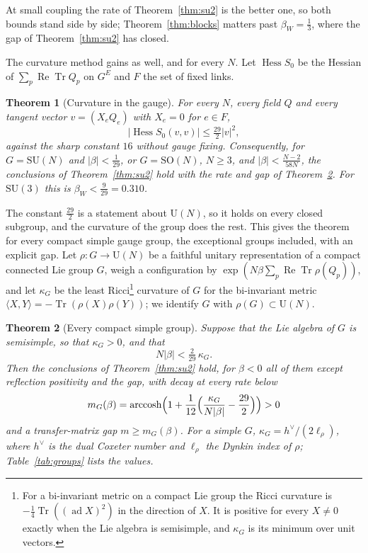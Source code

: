 \documentclass[aps,prd,twocolumn,superscriptaddress,nofootinbib,longbibliography,floatfix,amsmath,amssymb,10pt]{revtex4-2}
\newtheorem{theorem}{Theorem}
\theoremstyle{definition}
\theoremstyle{remark}
\newcommand{\SU}{\mathrm{SU}}
\newcommand{\SO}{\mathrm{SO}}
\newcommand{\U}{\mathrm{U}}
\newcommand{\Tr}{\operatorname{Tr}}
\newcommand{\ReTr}{\operatorname{Re}\operatorname{Tr}}
\newcommand{\Hess}{\operatorname{Hess}}
\newcommand{\ip}[2]{\langle #1,#2\rangle}
\begin{document}
At small coupling the rate of Theorem~\ref{thm:su2} is the better one, so
both bounds stand side by side; Theorem~\ref{thm:blocks} matters past
$\beta_W=\frac13$, where the gap of Theorem~\ref{thm:su2} has closed.

The curvature method gains as well, and for every $N$. Let $\Hess S_0$ be
the Hessian of $\sum_p\ReTr Q_p$ on $G^E$ and $F$ the set of fixed links.

\begin{theorem}[Curvature in the gauge]\label{thm:curv}
For every $N$, every field $Q$ and every tangent vector $v=(X_eQ_e)$ with
$X_e=0$ for $e\in F$,
\[
|\Hess S_0(v,v)|\le\tfrac{29}2|v|^2 ,
\]
against the sharp constant $16$ without gauge fixing. Consequently, for
$G=\SU(N)$ and $|\beta|<\frac1{29}$, or $G=\SO(N)$, $N\ge3$, and
$|\beta|<\frac{N-2}{58N}$, the conclusions of Theorem~\ref{thm:su2} hold
with the rate and gap of Theorem~\ref{thm:groups}. For $\SU(3)$ this is
$\beta_W<\frac9{29}=0.310$.
\end{theorem}

The constant $\frac{29}2$ is a statement about $\U(N)$, so it holds on every
closed subgroup, and the curvature of the group does the rest. This gives the
theorem for every compact simple gauge group, the exceptional groups
included, with an explicit gap. Let $\rho:G\to\U(N)$ be a faithful unitary
representation of a compact connected Lie group $G$, weigh a configuration by
$\exp(N\beta\sum_p\ReTr\rho(Q_p))$, and let $\kappa_G$ be the least Ricci\footnote{For a bi-invariant metric on a compact Lie group the Ricci curvature is $-\frac14\Tr((\operatorname{ad}X)^2)$ in the direction of $X$. It is positive for every $X\ne0$ exactly when the Lie algebra is semisimple, and $\kappa_G$ is its minimum over unit vectors.}
curvature of $G$ for the bi-invariant metric $\ip XY=-\Tr(\rho(X)\rho(Y))$;
we identify $G$ with $\rho(G)\subset\U(N)$.

\begin{theorem}[Every compact simple group]\label{thm:groups}
Suppose that the Lie algebra of $G$ is semisimple, so that $\kappa_G>0$, and
that
\[
N|\beta|<\tfrac2{29}\,\kappa_G .
\]
Then the conclusions of Theorem~\ref{thm:su2} hold, for $\beta<0$ all of them
except reflection positivity and the gap, with decay at every rate below
\[
m_G(\beta)=\operatorname{arccosh}\Bigl(1+\frac1{12}\Bigl(\frac{\kappa_G}{N|\beta|}
-\frac{29}2\Bigr)\Bigr)>0
\]
and a transfer-matrix gap $m\ge m_G(\beta)$. For a simple $G$,
$\kappa_G=h^\vee/(2\ell_\rho)$, where $h^\vee$ is the dual Coxeter number and
$\ell_\rho$ the Dynkin index of $\rho$; Table~\ref{tab:groups} lists the
values.
\end{theorem}
\end{document}
